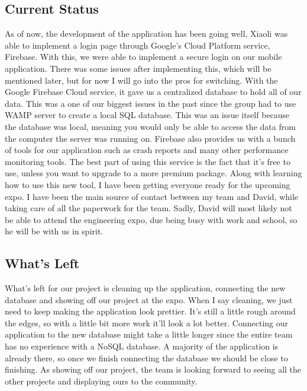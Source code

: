 \documentclass[letterpaper, 10pt,titlepage]{article}
\begin{document}
\subsection{Current Status}

As of now, the development of the application has been going well, Xiaoli was able to implement a login page through Google's Cloud Platform service, Firebase. With this, we were able to implement a secure login on our mobile application. There was some issues after implementing this, which will be mentioned later, but for now I will go into the pros for switching. With the Google Firebase Cloud service, it gave us a centralized database to hold all of our data. This was a one of our biggest issues in the past since the group had to use WAMP server to create a local SQL database. This was an issue itself because the database was local, meaning you would only be able to access the data from the computer the server was running on. Firebase also provides us with a bunch of tools for our application such as crash reports and many other performance monitoring tools. The best part of using this service is the fact that it's free to use, unless you want to upgrade to a more premium package. Along with learning how to use this new tool, I have been getting everyone ready for the upcoming expo. I have been the main source of contact between my team and David, while taking care of all the paperwork for the team. Sadly, David will most likely not be able to attend the engineering expo, due being busy with work and school, so he will be with us in spirit. 

\subsection{What's Left}

What's left for our project is cleaning up the application, connecting the new database and showing off our project at the expo. When I say cleaning, we just need to keep making the application look prettier. It's still a little rough around the edges, so with a little bit more work it'll look a lot better. Connecting our application to the new database might take a little longer since the entire team has no experience with a NoSQL database. A majority of the application is already there, so once we finish connecting the database we should be close to finishing. As showing off our project, the team is looking forward to seeing all the other projects and displaying ours to the community. 
\end{document}
